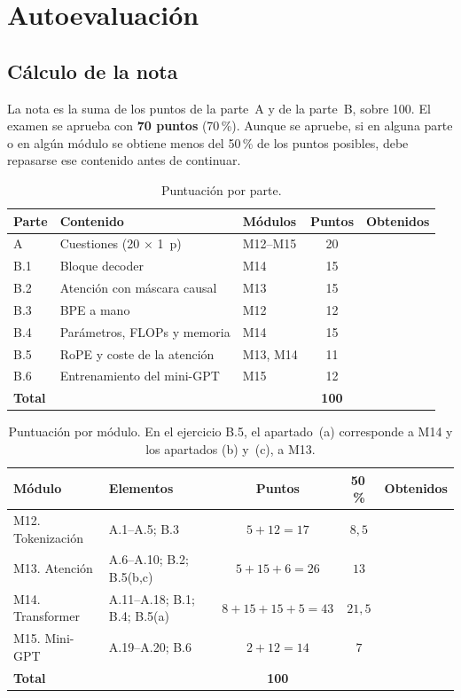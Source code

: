 \chapter{Autoevaluación}
\label{ap:autoevaluacion}

\section{Cálculo de la nota}

La nota es la suma de los puntos de la parte~A y de la parte~B, sobre 100. El examen se aprueba con \textbf{70 puntos} (70\,\%). Aunque se apruebe, si en alguna parte o en algún módulo se obtiene menos del 50\,\% de los puntos posibles, debe repasarse ese contenido antes de continuar.

\begin{table}[ht]
\centering\small
\caption{Puntuación por parte.}\label{tab:partes}
\begin{tabular}{@{}lllcc@{}}
\toprule
Parte & Contenido & Módulos & Puntos & Obtenidos \\
\midrule
A & Cuestiones (20 $\times$ 1~p) & M12--M15 & 20 & \\
B.1 & Bloque decoder & M14 & 15 & \\
B.2 & Atención con máscara causal & M13 & 15 & \\
B.3 & BPE a mano & M12 & 12 & \\
B.4 & Parámetros, FLOPs y memoria & M14 & 15 & \\
B.5 & RoPE y coste de la atención & M13, M14 & 11 & \\
B.6 & Entrenamiento del mini-GPT & M15 & 12 & \\
\midrule
\textbf{Total} & & & \textbf{100} & \\
\bottomrule
\end{tabular}
\end{table}

\begin{table}[ht]
\centering\small
\caption{Puntuación por módulo. En el ejercicio B.5, el apartado~(a) corresponde a M14 y los apartados (b) y~(c), a M13.}\label{tab:modulos}
\begin{tabular}{@{}llccc@{}}
\toprule
Módulo & Elementos & Puntos & 50\,\% & Obtenidos \\
\midrule
M12. Tokenización & A.1--A.5; B.3 & $5+12=17$ & $8{,}5$ & \\
M13. Atención & A.6--A.10; B.2; B.5(b,c) & $5+15+6=26$ & $13$ & \\
M14. Transformer & A.11--A.18; B.1; B.4; B.5(a) & $8+15+15+5=43$ & $21{,}5$ & \\
M15. Mini-GPT & A.19--A.20; B.6 & $2+12=14$ & $7$ & \\
\midrule
\textbf{Total} & & \textbf{100} & & \\
\bottomrule
\end{tabular}
\end{table}

